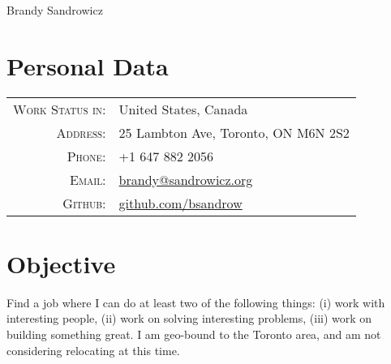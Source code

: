 \documentclass[a4paper,10pt]{article}
\begin{document}
    \pagestyle{empty} %

    
        \par{\centering
            {\Huge Brandy Sandrowicz }
            \bigskip\par}
    

    
        \section{Personal Data}
        \begin{tabular}{ r l }
        \textsc{Work Status in:}                & United States, Canada\\
        \textsc{Address:}                       & 25 Lambton Ave, Toronto, ON M6N 2S2\\
        \textsc{Phone:}                         & +1 647 882 2056\\
        \textsc{Email:}                         & \href{mailto:brandy@sandrowicz.org}{brandy@sandrowicz.org}\\
        \textsc{Github:}                        & \href{http://github.com/bsandrow}{github.com/bsandrow}\\
        \end{tabular}
    

    
        \section{Objective}
        Find a job where I can do at least two of the following things: (i) work with
        interesting people, (ii) work on solving interesting problems, (iii) work on
        building something great. I am geo-bound to the Toronto area, and am
        not considering relocating at this time.
    

    
\end{document}
